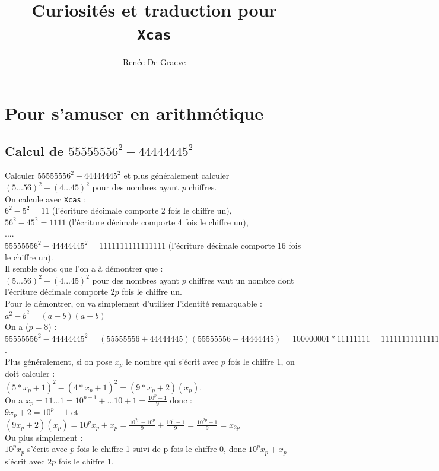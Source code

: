 \documentclass[a4paper,11pt]{book}
\title{Curiosit\'es et traduction pour\\ {\tt Xcas}}
\author{Ren\'ee De Graeve}
\begin{document}
\maketitle
\chapter{Pour s'amuser en arithm\'etique}
\section{Calcul de $55555556^2-44444445^2$}
Calculer 
$55555556^2-44444445^2$ et plus g\'en\'eralement calculer
$(5...56)^2-(4...45)^2$ pour des nombres ayant  $p$ chiffres.\\

On calcule avec {\tt Xcas} :\\
$6^2-5^2=11$ (l'\'ecriture d\'ecimale comporte 2 fois le chiffre un), \\
$56^2-45^2=1111$ (l'\'ecriture d\'ecimale comporte 4 fois le chiffre un),\\
....\\
$55555556^2-44444445^2=1111111111111111$ (l'\'ecriture d\'ecimale comporte 16  
fois le chiffre un).\\
Il semble donc que l'on a \`a d\'emontrer que :\\
$(5...56)^2-(4...45)^2$ pour des nombres ayant $p$ chiffres vaut un nombre dont
l'\'ecriture d\'ecimale comporte $2p$ fois le chiffre un.\\
Pour le d\'emontrer, on va simplement d'utiliser l'identit\'e remarquable :\\
$a^2-b^2=(a-b)(a+b)$\\
On a ($p=8$) :\\
$55555556^2-44444445^2=(55555556+44444445)(55555556-44444445)=100000001*11111111=1111111111111111$.\\
Plus g\'en\'eralement, si on pose $x_p$ le nombre qui s'\'ecrit avec $p$ fois 
le chiffre 1,
on doit calculer :\\
$(5*x_p+1)^2-(4*x_p+1)^2=(9*x_p+2)(x_p)$.\\
On a $\displaystyle x_p=11...1=10^{p-1}+...10+1=\frac{10^p-1}{9}$ donc :\\
$9x_p+2=10^p+1$ et \\
$\displaystyle (9x_p+2)(x_p)=10^px_p+x_p=\frac{10^{2p}-10^p}{9}+\frac{10^p-1}{9}=\frac{10^{2p}-1}{9}=x_{2p}$\\
Ou plus simplement :\\
 $10^px_p$ s'\'ecrit avec  $p$ fois le chiffre 1 suivi de p fois le 
chiffre 0, donc  $10^px_p+x_p$ s'\'ecrit avec  $2p$ fois le chiffre 1.
\end{document}
